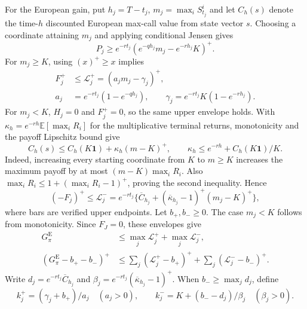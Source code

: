 \documentclass[11pt]{article}
\newcommand{\E}{\mathbb E}
\begin{document}
For the European gain, put $h_j=T-t_j$, $m_j=\max_iS^i_{t_j}$ and let $C_h(s)$ denote the time-$h$ discounted European max-call value from state vector $s$. Choosing a coordinate attaining $m_j$ and applying conditional Jensen gives
\begin{equation}
 P_j\geq e^{-rt_j}(e^{-qh_j}m_j-e^{-rh_j}K)^+.
\label{eq:european-continuation-jensen}
\end{equation}
For $m_j\geq K$, using $(x)^+\geq x$ implies
\begin{equation}
\begin{aligned}
 F_j^+&\leq \mathcal L_j^+=(a_jm_j-\gamma_j)^+,\\
 a_j&=e^{-rt_j}(1-e^{-qh_j}),\qquad
 \gamma_j=e^{-rt_j}K(1-e^{-rh_j}).
\end{aligned}
\label{eq:european-positive-envelope}
\end{equation}
For $m_j<K$, $H_j=0$ and $F_j^+=0$, so the same upper envelope holds. With $\kappa_h=e^{-rh}\E[\max_iR_i]$ for the multiplicative terminal returns, monotonicity and the payoff Lipschitz bound give
\begin{equation}
 C_h(s)\leq C_h(K\mathbf1)+\kappa_h(m-K)^+,
 \qquad
 \kappa_h\leq e^{-rh}+C_h(K\mathbf1)/K.
\label{eq:european-growth-envelope}
\end{equation}
Indeed, increasing every starting coordinate from $K$ to $m\geq K$ increases the maximum payoff by at most $(m-K)\max_iR_i$. Also $\max_iR_i\leq1+(\max_iR_i-1)^+$, proving the second inequality. Hence
\begin{equation}
 (-F_j)^+\leq \mathcal L_j^-=e^{-rt_j}\{\overline C_{h_j}
       +(\overline\kappa_{h_j}-1)^+(m_j-K)^+\},
\label{eq:european-negative-envelope}
\end{equation}
where bars are verified upper endpoints. Let $b_+,b_-\geq0$. The case $m_j<K$ follows from monotonicity. Since $F_J=0$, these envelopes give
\begin{equation}
\begin{aligned}
 G^{\mathrm E}_\pi&\leq\max_j \mathcal L_j^++\max_j \mathcal L_j^-,\\
 (G^{\mathrm E}_\pi-b_+-b_-)^+
 &\leq\sum_j(\mathcal L_j^+-b_+)^++\sum_j(\mathcal L_j^--b_-)^+.
\end{aligned}
\label{eq:european-gain-tail-split}
\end{equation}
Write $d_j=e^{-rt_j}\overline C_{h_j}$ and $\beta_j=e^{-rt_j}(\overline\kappa_{h_j}-1)^+$. When $b_-\geq\max_jd_j$, define
\begin{equation}
 k_j^+=(\gamma_j+b_+)/a_j\quad(a_j>0),\qquad
 k_j^-=K+(b_--d_j)/\beta_j\quad(\beta_j>0).
\label{eq:european-tail-thresholds}
\end{equation}
\end{document}
